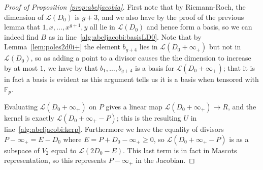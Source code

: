 \documentclass[12pt]{article}
\newcommand{\Lcal}{\mathcal{L}}
\newcommand{\F}{\mathbb{F}}
\theoremstyle{plain}
\theoremstyle{definition}
\theoremstyle{remark}
\begin{document}
\begin{proof}[Proof of Proposition \ref{prop:abeljacobia}]
First note that by Riemann-Roch, the dimension of $\Lcal(D_0)$ is $g + 3$, and we also have by the proof of the previous lemma that $1,x,\dots,x^{g+1},y$ all lie in $\Lcal(D_0)$ and hence form a basis, so we can indeed find $B$ as in line~\ref{alg:abeljacobi:basisLD0}. Note that by Lemma~\ref{lem:poles2d0i+} the element $b_{g+4}$ lies in $\Lcal(D_0 + \infty_+)$ but not in $\Lcal(D_0)$, so as adding a point to a divisor causes the the dimension to increase by at most $1$, we have by that $b_1,\dots,b_{g+4}$ is a basis for $\Lcal(D_0 + \infty_+)$; that it is in fact a basis is evident as this argument tells us it is a basis when tensored with $\F_p$.

Evaluating $\Lcal(D_0 + \infty_+)$ on $P$ gives a linear map $\Lcal(D_0 + \infty_+) \to R$, and the kernel is exactly $\Lcal(D_0 + \infty_+ - P)$; this is the resulting $U$ in line~\ref{alg:abeljacobi:kerp}. Furthermore we have the equality of divisors $P-\infty_+ = E - D_0$ where $E = P + D_0 - \infty_+ \geq 0$, so $\Lcal(D_0 + \infty_+ - P)$ is as a subspace of $V_2$ equal to $\Lcal(2D_0 - E)$. This last term is in fact in Mascots representation, so this represents $P-\infty_+$ in the Jacobian.
\end{proof}
\end{document}
